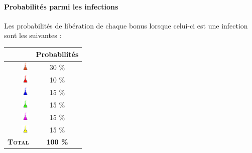 \paragraph{Probabilités parmi les infections}
Les probabilités de libération de chaque bonus lorsque celui-ci est une infection sont les suivantes :\begin{center}
\begin{tabular}{|r|c|}
\hline 
& Probabilités \\ 
\hline 
\includegraphics[width=15px,height=15px]{images/crane.png} & 30 \% \\ 
\hline 
\includegraphics[width=15px,height=15px]{images/hell.png} & 10 \% \\ 
\hline 
\includegraphics[width=15px,height=15px]{images/confusion.png} & 15 \% \\ 
\hline 
\includegraphics[width=15px,height=15px]{images/spasme.png} & 15 \% \\ 
\hline 
\includegraphics[width=15px,height=15px]{images/dilatation.png} & 15 \% \\ 
\hline 
\includegraphics[width=15px,height=15px]{images/rage.png} & 15 \% \\ 
\hline 
\textbf{\textsc{Total}} & \textbf{100 \%} \\ 
\hline 
\end{tabular} 
\end{center}
